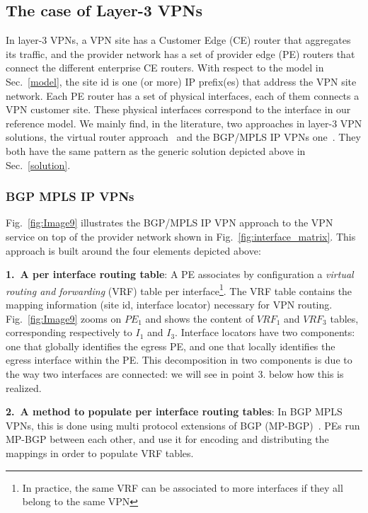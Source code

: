 \subsection{The case of Layer-3 VPNs}
In layer-3 VPNs, a VPN site has a Customer Edge (CE) router that aggregates its traffic, and the provider network has a set of provider edge (PE) routers that connect the different enterprise CE routers. With respect to the model in Sec.~\ref{model}, the site id is one (or more) IP prefix(es) that address the VPN site network. Each PE router has a set of physical interfaces, each of them connects a VPN customer site.
These physical interfaces correspond to the interface in our reference model. We mainly find, in the literature, two approaches in layer-3 VPN solutions, the virtual router approach~\cite{VR:draft} and the BGP/MPLS IP VPNs one~\cite{rfc:4364}. They both have the same pattern as the generic solution depicted above in Sec.~\ref{solution}.

\subsubsection{BGP MPLS IP VPNs}\label{bgp_mpls}
Fig.~\ref{fig:Image9} illustrates the BGP/MPLS IP VPN approach to the VPN service on top of the provider network shown in Fig.~\ref{fig:interface_matrix}. This approach is built around the four elements depicted above:


	\vspace{1mm}\noindent \textbf{1.~A per interface routing table}: A PE associates by configuration a \emph{virtual routing and forwarding} (VRF) table per interface\footnote{In practice, the same VRF can be associated to more interfaces if they all belong to the same VPN}. The VRF table contains the mapping information (site id, interface locator) necessary for VPN routing. Fig.~\ref{fig:Image9} zooms on $PE_{1}$ and shows the content of $VRF_{1}$ and $VRF_{3}$ tables, corresponding respectively to $I_{1}$ and $I_{3}$. 
Interface locators have two components: one that globally identifies the egress PE, and one that locally identifies the egress interface within the PE. This decomposition in two components is due to the way two interfaces are connected: we will see in point 3. below how this is realized. 


	\vspace{1mm}\noindent \textbf{2.~A method to populate per interface routing tables}: In BGP MPLS VPNs, this is done using multi protocol extensions of BGP (MP-BGP)~\cite{mpbgp-rfc4760}. 
PEs run MP-BGP between each other, and use it for encoding and distributing the mappings in order to populate VRF tables.  
	
